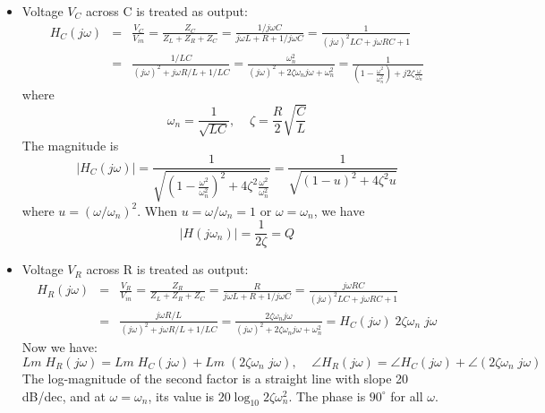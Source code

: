 \documentclass{article}
\begin{document}
\begin{itemize}
\item Voltage $V_C$ across C is treated as output:
  \begin{eqnarray}
    H_C(j\omega)&=&\frac{V_C}{V_{in}}=\frac{Z_C}{Z_L+Z_R+Z_C}
    =\frac{1/j\omega C}{j\omega L+R+1/j\omega C}
    =\frac{1}{(j\omega)^2 LC+j\omega RC+1}
    \nonumber \\
    &=&\frac{1/LC}{(j\omega)^2 +j\omega R/L+1/LC}
    =\frac{\omega_n^2}{(j\omega)^2 +2\zeta\omega_n j\omega+\omega^2_n} 
    =\frac{1}{(1-\frac{\omega^2}{\omega_n^2})+j2\zeta\frac{\omega}{\omega_n}}
  \end{eqnarray}
  where 
  \begin{equation} 
    \omega_n=\frac{1}{\sqrt{LC}},\;\;\;\;\zeta=\frac{R}{2}\sqrt{\frac{C}{L}} 
  \end{equation}
  The magnitude is
  \begin{equation} 
    |H_C(j\omega)|
    =\frac{1}{\sqrt{(1-\frac{\omega^2}{\omega_n^2})^2+4\zeta^2 \frac{\omega^2}{\omega_n^2}}}
    =\frac{1}{\sqrt{(1-u)^2+4\zeta^2 u}} 
  \end{equation}
  where $u=(\omega/\omega_n)^2$. When $u=\omega/\omega_n=1$ or $\omega=\omega_n$, we have
  \begin{equation} 
    | H(j\omega_n) |=\frac{1}{2\zeta}=Q 
  \end{equation}
\item Voltage $V_R$ across R is treated as output:
  \begin{eqnarray}
    H_R(j\omega)&=&\frac{V_R}{V_{in}}=\frac{Z_R}{Z_L+Z_R+Z_C}
    =\frac{R}{j\omega L+R+1/j\omega C}
    =\frac{j\omega RC}{(j\omega)^2 LC+j\omega RC+1}
    \nonumber \\
    &=&\frac{j\omega R/L}{(j\omega)^2 +j\omega R/L+1/LC}
    =\frac{2\zeta\omega_nj\omega}{(j\omega)^2 +2\zeta\omega_n j\omega+\omega^2_n} 
    =H_C(j\omega) \;2\zeta \omega_n\;j \omega 
  \end{eqnarray}
  Now we have:
  \begin{equation} 
    Lm\;H_R(j\omega)=Lm\; H_C(j\omega)+Lm\;(2\zeta\omega_n\;j\omega),\;\;\;\;
    \angle H_R(j\omega)=\angle H_C(j\omega)+\angle(2\zeta\omega_n\;j\omega) 
  \end{equation}
  The log-magnitude of the second factor is a straight line with slope 20 dB/dec,
  and at $\omega=\omega_n$, its value is $20\log_{10} 2\zeta\omega_n^2$. The phase is 
  $90^\circ$ for all $\omega$.
  

\end{itemize}
\end{document}
